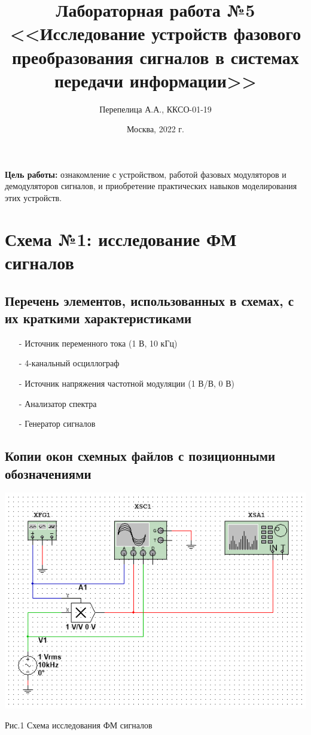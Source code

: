 \documentclass[11pt]{article}
\title{\textbf{Лабораторная работа №5\\<<Исследование устройств фазового преобразования сигналов в системах передачи информации>>}}
\author{Перепелица А.А., ККСО-01-19}
\date{Москва, 2022 г.}
\begin{document}
\maketitle
\thispagestyle{empty}
\textbf{Цель работы:} ознакомление с устройством, работой фазовых модуляторов и демодуляторов сигналов, и приобретение практических навыков  моделирования этих устройств. 

\section{Схема №1: исследование ФМ сигналов}
\subsection{Перечень элементов, использованных в схемах, с
их краткими характеристиками}
\begin{itemize}
    \item[-] Источник переменного тока (1 В, 10 кГц)
    \item[-] 4-канальный осциллограф
    \item[-] Источник напряжения частотной модуляции (1 В/В, 0 В)
    \item[-] Анализатор спектра
    \item[-] Генератор сигналов 
\end{itemize}


\subsection{Копии окон схемных файлов с позиционными обозначениями}
\includegraphics[width=1\linewidth]{img/scheme1.png}
\begin{center}
    Рис.1 Схема исследования ФМ сигналов
\end{center}
\end{document}

